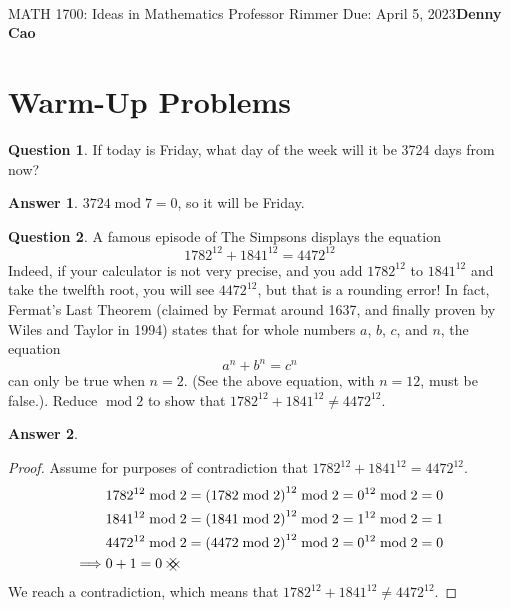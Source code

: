 \documentclass[article, 12pt]{article}
\title{\Large\bf{\psetName}}
\makeatletter
\theoremstyle{definition}
\newcommand{\courseNumber}{MATH 1700}
\newcommand{\courseName}{Ideas in Mathematics}
\newcommand{\professor}{Professor Rimmer}
\newcommand{\dueDate}{Due: April 5, 2023}
\newcommand{\name}{Denny Cao}
\newtheorem{question}{Question}
\newtheorem{answer}{Answer}
\DeclarePairedDelimiter\paren{(}{)} %
\newcommand{\Mod}[1]{\;\mathrm{mod}\; #1} %
\newcommand{\contradiction}{{\hbox{%
    \setbox0=\hbox{$\mkern-3mu\times\mkern-3mu$}%
    \setbox1=\hbox to0pt{\hss$\times$\hss}%
    \copy0\raisebox{0.5\wd0}{\copy1}\raisebox{-0.5\wd0}{\box1}\box0
}}}
\renewcommand{\maketitle}{\bgroup\setlength{\parindent}{0pt}
    \begin{flushleft}
        \textbf{\@title} \\ \vskip0.2cm
        \begingroup
            \fontsize{14pt}{12pt}\selectfont
            \courseNumber: \courseName 
            \vskip0.3cm 
            \professor
        \endgroup \vskip0.3cm
        \dueDate \hfill\rlap{}\bf{\name} \\ \vskip0.1cm
        \hrulefill
    \end{flushleft}\egroup 
}
\makeatother
\begin{document}
    \maketitle
    \thispagestyle{plain}
    \section{Warm-Up Problems}
    \begin{question}
        If today is Friday, what day of the week will it be 3724 days from now?
    \end{question} 
    \begin{answer}
        $3724\Mod{7} = 0$, so it will be Friday.
    \end{answer}
    \begin{question}
        A famous episode of The Simpsons displays the equation
        \[ 1782^{12} + 1841^{12} = 4472^{12} \]
        Indeed, if your calculator is not very precise, and you add $1782^{12}$ to $1841^{12}$ and take the twelfth root, you will see $4472^{12}$, but that is a rounding error! In fact, Fermat's Last Theorem (claimed by Fermat around 1637, and finally proven by Wiles and Taylor in 1994) states that for whole numbers $a$, $b$, $c$, and $n$, the equation
        \[ a^n + b^n = c^n \]
        can only be true when $n=2$. (See the above equation, with $n=12$, must be false.). Reduce $\Mod{2}$ to show that $1782^{12} + 1841^{12} \neq 4472^{12}$.
    \end{question}
    \begin{answer} \
        \begin{proof}
            Assume for purposes of contradiction that $1782^{12} + 1841^{12} = 4472^{12}$.
            \begin{align*}
                &1782^{12} \Mod{2} = \paren*{1782 \Mod{2}}^{12} \Mod{2} = 0^{12} \Mod{2} = 0 \\
                &1841^{12} \Mod{2} = \paren*{1841 \Mod{2}}^{12} \Mod{2} = 1^{12} \Mod{2} = 1 \\
                &4472^{12} \Mod{2} = \paren*{4472 \Mod{2}}^{12} \Mod{2} = 0^{12} \Mod{2} = 0 \\
                \implies &0 + 1 = 0 \ \contradiction
            \end{align*}
            We reach a contradiction, which means that $1782^{12} + 1841^{12} \neq 4472^{12}$.
        \end{proof}
    \end{answer}
\end{document}
